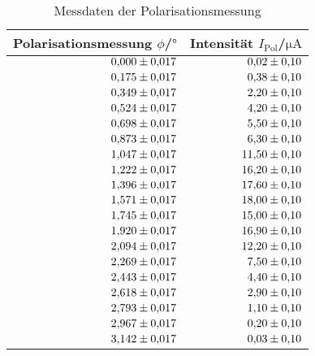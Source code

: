 \begin{table}
 \caption{Messdaten der Polarisationsmessung}
 \label{tab:polarisation}
 \centering
{} \begin{tabular}{rr}
 \toprule 
    {Polarisationsmessung $\phi$/$\si{\degree}$}& {Intensität $I_{\mathrm{Pol}}$/$\si{\micro\ampere}$} \\
     \midrule
     $\num{0.000 \pm 0.017}$ & $\num{0.02\pm0.10}$ \\
     $\num{0.175 \pm 0.017}$ & $\num{0.38\pm0.10}$ \\
     $\num{0.349 \pm 0.017}$ & $\num{2.20\pm0.10}$ \\
     $\num{0.524 \pm 0.017}$ & $\num{4.20\pm0.10}$ \\
     $\num{0.698 \pm 0.017}$ & $\num{5.50\pm0.10}$ \\
     $\num{0.873 \pm 0.017}$ & $\num{6.30\pm0.10}$ \\
     $\num{1.047 \pm 0.017}$ & $\num{11.50\pm0.10}$ \\
     $\num{1.222 \pm 0.017}$ & $\num{16.20\pm0.10}$ \\
     $\num{1.396 \pm 0.017}$ & $\num{17.60\pm0.10}$ \\
     $\num{1.571 \pm 0.017}$ & $\num{18.00\pm0.10}$ \\
     $\num{1.745 \pm 0.017}$ & $\num{15.00\pm0.10}$ \\
     $\num{1.920 \pm 0.017}$ & $\num{16.90\pm0.10}$ \\
     $\num{2.094 \pm 0.017}$ & $\num{12.20\pm0.10}$ \\
     $\num{2.269 \pm 0.017}$ & $\num{7.50\pm0.10}$ \\
     $\num{2.443 \pm 0.017}$ & $\num{4.40\pm0.10}$ \\
     $\num{2.618 \pm 0.017}$ & $\num{2.90\pm0.10}$ \\
     $\num{2.793 \pm 0.017}$ & $\num{1.10\pm0.10}$ \\
     $\num{2.967 \pm 0.017}$ & $\num{0.20\pm0.10}$ \\
     $\num{3.142 \pm 0.017}$ & $\num{0.03\pm0.10}$ \\
 \bottomrule
 \end{tabular}
\end{table}